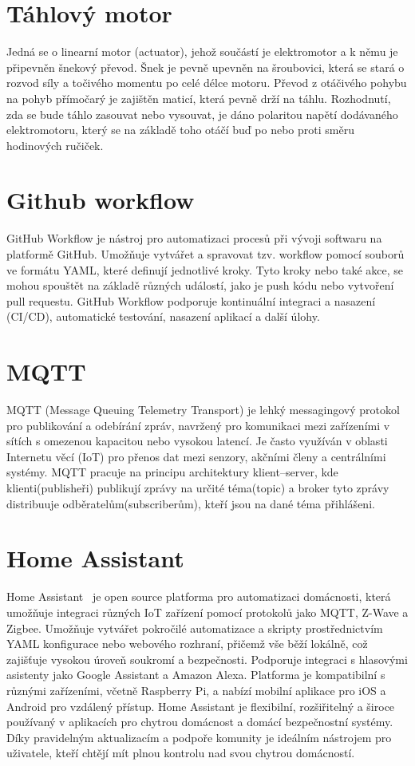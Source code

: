 \section{Táhlový motor}\label{sec:tahlovy-motor}
Jedná se o linearní motor (actuator), jehož součástí je elektromotor a k němu je připevněn šnekový převod.
Šnek je pevně upevněn na šroubovici, která se stará o rozvod síly a točivého momentu po celé délce motoru.
Převod z otáčivého pohybu na pohyb přímočarý je zajištěn maticí, která pevně drží na táhlu.
Rozhodnutí, zda se bude táhlo zasouvat nebo vysouvat, je dáno polaritou napětí dodávaného elektromotoru, který se na základě toho otáčí buď po nebo proti směru hodinových ručiček.

\section{Github workflow}\label{sec:github-workflow}
GitHub Workflow je nástroj pro automatizaci procesů při vývoji softwaru na platformě GitHub.
Umožňuje vytvářet a spravovat tzv. workflow pomocí souborů ve formátu YAML, které definují jednotlivé kroky.
Tyto kroky nebo také akce, se mohou spouštět na základě různých událostí, jako je push kódu nebo vytvoření pull requestu.
GitHub Workflow podporuje kontinuální integraci a nasazení (CI/CD), automatické testování, nasazení aplikací a další úlohy.

\section{MQTT}\label{sec:mqtt}
MQTT (Message Queuing Telemetry Transport) je lehký messagingový protokol pro publikování a odebírání zpráv, navržený pro komunikaci mezi zařízeními v sítích s omezenou kapacitou nebo vysokou latencí.
Je často využíván v oblasti Internetu věcí (IoT) pro přenos dat mezi senzory, akčními členy a centrálními systémy.
MQTT pracuje na principu architektury klient–server, kde klienti(publisheři) publikují zprávy na určité téma(topic) a broker tyto zprávy distribuuje odběratelům(subscriberům), kteří jsou na dané téma přihlášeni.

\section{Home Assistant}\label{sec:home-assistant}
Home Assistant~\cite{co-je-to-ha} je open source platforma pro automatizaci domácnosti, která umožňuje integraci různých IoT zařízení pomocí protokolů jako MQTT, Z-Wave a Zigbee.
Umožňuje vytvářet pokročilé automatizace a skripty prostřednictvím YAML konfigurace nebo webového rozhraní, přičemž vše běží lokálně, což zajišťuje vysokou úroveň soukromí a bezpečnosti.
Podporuje integraci s hlasovými asistenty jako Google Assistant a Amazon Alexa.
Platforma je kompatibilní s různými zařízeními, včetně Raspberry Pi, a nabízí mobilní aplikace pro iOS a Android pro vzdálený přístup.
Home Assistant je flexibilní, rozšiřitelný a široce používaný v aplikacích pro chytrou domácnost a domácí bezpečnostní systémy.
Díky pravidelným aktualizacím a podpoře komunity je ideálním nástrojem pro uživatele, kteří chtějí mít plnou kontrolu nad svou chytrou domácností.

